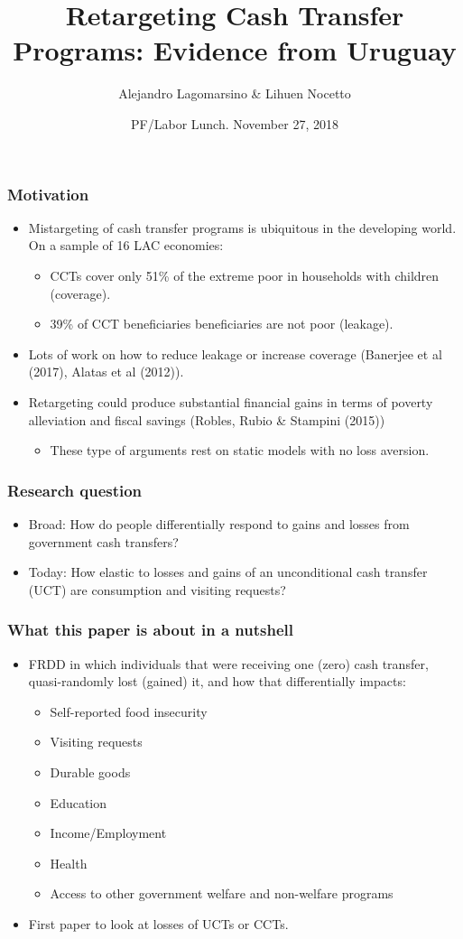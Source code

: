 \documentclass{beamer}
\title[Retargeting Cash Transfer Programs] %
{Retargeting Cash Transfer Programs: Evidence from Uruguay}
\author[Alejandro Lagomarsino] %
{Alejandro Lagomarsino \& Lihuen Nocetto\inst{*} }
\institute[] %
{
	\inst{*}%
	Harvard University\\
	Pontifical Catholic University of Chile
}
\date[PF/Labor Lunch - November 2018] %
{PF/Labor Lunch. November 27, 2018}
\begin{document}
	\setlength{\parindent}{10pt}
	
	\frame{\titlepage}

\begin{frame}
\frametitle{Motivation}
\begin{itemize}
	\item Mistargeting of cash transfer programs is ubiquitous in the developing world. On a sample of 16 LAC economies:
	\begin{itemize}
		\item CCTs cover only 51\% of the extreme poor in households with children (coverage).
		\item 39\% of CCT beneficiaries beneficiaries are not poor (leakage).

	\end{itemize}
	\item Lots of work on how to reduce leakage or increase coverage (Banerjee et al (2017), Alatas et al (2012)). 
	\item Retargeting could produce substantial financial gains in terms of poverty alleviation and fiscal savings (Robles, Rubio \& Stampini (2015))
	\begin{itemize}
		\item These type of arguments rest on static models with no loss aversion.
	\end{itemize}
\end{itemize}
\end{frame}

\begin{frame}
\frametitle{Research question}
\begin{itemize}
	\item Broad: How do people differentially respond to gains and losses from government cash transfers?
	\item Today: How elastic to losses and gains of an unconditional cash transfer (UCT) are consumption and visiting requests?
\end{itemize}
\end{frame}

\begin{frame}
\frametitle{What this paper is about in a nutshell}
\begin{itemize}
\item FRDD in which individuals that were receiving one (zero) cash transfer, quasi-randomly lost (gained) it, and how that differentially impacts:
\begin{itemize}
	\item Self-reported food insecurity
	\item Visiting requests
	\item {\color{gray}Durable goods}
	\item {\color{gray}Education}
	\item {\color{gray}Income/Employment}
	\item {\color{gray}Health}
	\item {\color{gray}Access to other government welfare and non-welfare programs}
\end{itemize}
\item First paper to look at losses of UCTs or CCTs.
\end{itemize}
\end{frame}
\end{document}
